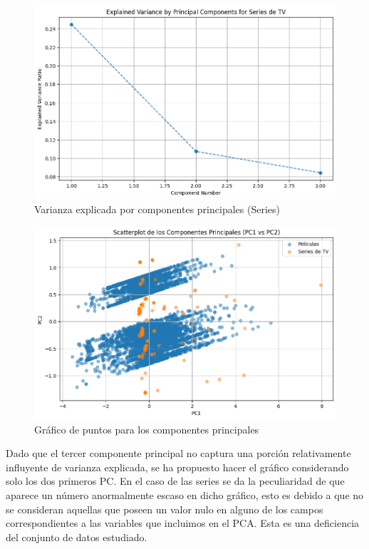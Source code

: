 \documentclass{article}
\begin{document}
\begin{figure}[H]
    \centering
    \includegraphics[width=\textwidth]{Graphs/PC_series.png}
    \caption{Varianza explicada por componentes principales (Series)}
    \label{fig:PC_series}
\end{figure}

\begin{figure}[H]
    \centering
    \includegraphics[width=\textwidth]{Graphs/scatterplot.png}
    \caption{Gráfico de puntos para los componentes principales}
    \label{fig:PC_series}
\end{figure}

Dado que el tercer componente principal no captura una porción relativamente influyente de varianza explicada, se ha propuesto hacer el gráfico considerando solo los dos primeros PC. En el caso de las series se da la peculiaridad de que aparece un número anormalmente escaso en dicho gráfico, esto es debido a que no se consideran aquellas que poseen un valor nulo en alguno de los campos correspondientes a las variables que incluimos en el PCA. Esta es una deficiencia del conjunto de datos estudiado.
\end{document}
